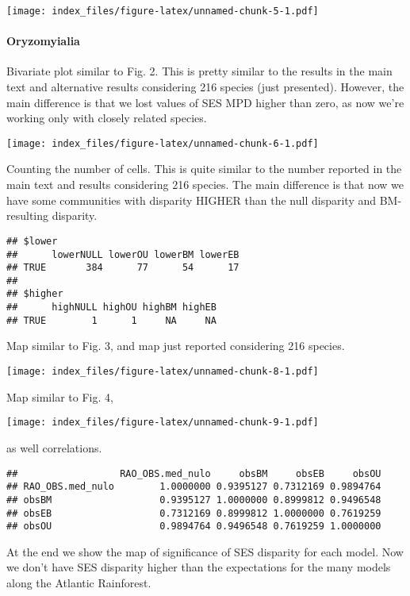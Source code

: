\documentclass[
]{article}
\begin{document}
\texttt{[image: index\_files/figure-latex/unnamed-chunk-5-1.pdf]}

\hypertarget{oryzomyialia}{%
\paragraph{Oryzomyialia}\label{oryzomyialia}}

Bivariate plot similar to Fig. 2. This is pretty similar to the results
in the main text and alternative results considering 216 species (just
presented). However, the main difference is that we lost values of SES
MPD higher than zero, as now we're working only with closely related
species.

\texttt{[image: index\_files/figure-latex/unnamed-chunk-6-1.pdf]}

Counting the number of cells. This is quite similar to the number
reported in the main text and results considering 216 species. The main
difference is that now we have some communities with disparity HIGHER
than the null disparity and BM-resulting disparity.

\begin{verbatim}
## $lower
##      lowerNULL lowerOU lowerBM lowerEB
## TRUE       384      77      54      17
## 
## $higher
##      highNULL highOU highBM highEB
## TRUE        1      1     NA     NA
\end{verbatim}

Map similar to Fig. 3, and map just reported considering 216 species.

\texttt{[image: index\_files/figure-latex/unnamed-chunk-8-1.pdf]}

Map similar to Fig. 4,

\texttt{[image: index\_files/figure-latex/unnamed-chunk-9-1.pdf]}

as well correlations.

\begin{verbatim}
##                  RAO_OBS.med_nulo     obsBM     obsEB     obsOU
## RAO_OBS.med_nulo        1.0000000 0.9395127 0.7312169 0.9894764
## obsBM                   0.9395127 1.0000000 0.8999812 0.9496548
## obsEB                   0.7312169 0.8999812 1.0000000 0.7619259
## obsOU                   0.9894764 0.9496548 0.7619259 1.0000000
\end{verbatim}

At the end we show the map of significance of SES disparity for each
model. Now we don't have SES disparity higher than the expectations for
the many models along the Atlantic Rainforest.
\end{document}
